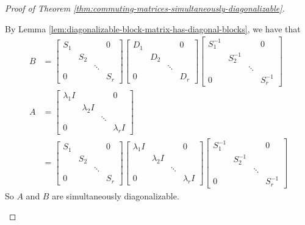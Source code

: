 \begin{proof}[Proof of Theorem \ref{thm:commuting-matrices-simultaneously-diagonalizable}]
\begin{itemize}
    By Lemma \ref{lem:diagonalizable-block-matrix-has-diagonal-blocks}, we have that
    \begin{align*}
        B &= \begin{bmatrix}
            S_1 & & & 0 \\
            & S_2 & & \\
            & & \ddots & \\
            0 & & & S_r
            \end{bmatrix}
            \begin{bmatrix}
            D_1 & & & 0 \\
            & D_2 & & \\
            & & \ddots & \\
            0 & & & D_r
            \end{bmatrix}
            \begin{bmatrix}
            S_1^{-1} & & & 0 \\
            & S_2^{-1} & & \\
            & & \ddots & \\
            0 & & & S_r^{-1}
            \end{bmatrix} \\
        A &= \begin{bmatrix}
            \lambda_1 I & & & 0 \\
            & \lambda_2 I & & \\
            & & \ddots & \\
            0 & & & \lambda_r I
        \end{bmatrix} \\
          &= \begin{bmatrix}
            S_1 & & & 0 \\
            & S_2 & & \\
            & & \ddots & \\
            0 & & & S_r
            \end{bmatrix}
            \begin{bmatrix}
            \lambda_1 I & & & 0 \\
            & \lambda_2 I & & \\
            & & \ddots & \\
            0 & & & \lambda_r I
            \end{bmatrix}
            \begin{bmatrix}
            S_1^{-1} & & & 0 \\
            & S_2^{-1} & & \\
            & & \ddots & \\
            0 & & & S_r^{-1}
            \end{bmatrix}
    \end{align*}
    So $A$ and $B$ are simultaneously diagonalizable.
    

\end{itemize}
\end{proof}
